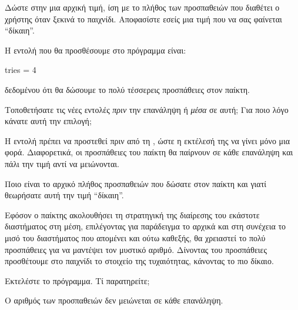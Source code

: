 \documentclass[a4paper,11pt,oneside]{book}
\begin{document}
\begin{step}
\label{step:tries-init}
Δώστε στην  μια αρχική τιμή, ίση με το πλήθος των προσπαθειών που διαθέτει ο χρήστης όταν ξεκινά το παιχνίδι. Αποφασίστε εσείς μια τιμή που να σας φαίνεται ``δίκαιη''.

\begin{answer}
	Η εντολή που θα προσθέσουμε στο πρόγραμμα είναι:
	
	\begin{pynew}
tries = 4
	\end{pynew}
	
	δεδομένου ότι θα δώσουμε το πολύ τέσσερεις προσπάθειες στον παίκτη.
\end{answer}

Τοποθετήσατε τις νέες εντολές \emph{πριν} την επανάληψη ή \emph{μέσα} σε αυτή; Για ποιο λόγο κάνατε αυτή την επιλογή;

\begin{answer}
	Η εντολή πρέπει να προστεθεί πριν από τη , ώστε η εκτέλεσή της να γίνει μόνο μια φορά. Διαφορετικά, οι προσπάθειες του παίκτη θα παίρνουν σε κάθε επανάληψη και πάλι την τιμή  αντί να μειώνονται.
\end{answer}

Ποιο είναι το αρχικό πλήθος προσπαθειών που δώσατε στον παίκτη και γιατί θεωρήσατε αυτή την τιμή ``δίκαιη''.

\begin{answer}
	Εφόσον ο παίκτης ακολουθήσει τη στρατηγική της διαίρεσης του εκάστοτε διαστήματος στη μέση, επιλέγοντας για παράδειγμα το  αρχικά και στη συνέχεια το μισό του διαστήματος που απομένει και ούτω καθεξής, θα χρειαστεί το πολύ  προσπάθειες για να μαντέψει τον μυστικό αριθμό. Δίνοντας του  προσπάθειες προσθέτουμε στο παιχνίδι το στοιχείο της τυχαιότητας, κάνοντας το πιο δίκαιο.
\end{answer}

Εκτελέστε το πρόγραμμα. Τί παρατηρείτε;

\begin{answer}
	Ο αριθμός των προσπαθειών δεν μειώνεται σε κάθε επανάληψη.
\end{answer}
\end{step}
\end{document}
